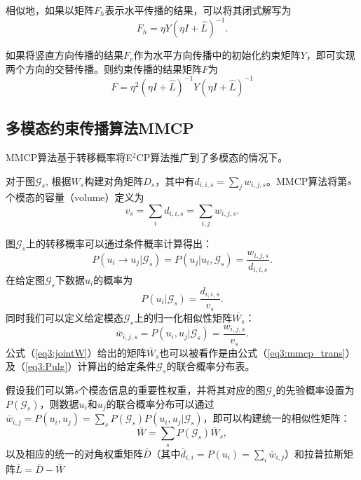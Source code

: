 相似地，如果以矩阵$F_h$表示水平传播的结果，可以将其闭式解写为
\begin{equation}
{F}_h = \eta{Y}(\eta{I}+\hat{{L}})^{-1}.
\end{equation}

如果将竖直方向传播的结果$F_v$作为水平方向传播中的初始化约束矩阵$Y$，即可实现两个方向的交替传播。则约束传播的结果矩阵$F$为
\begin{equation}
{F} = \eta^2(\eta{I}+\hat{{L}})^{-1}{Y}(\eta{I}+\hat{{L}})^{-1}
\label{eq3:e2cp}
\end{equation}

\subsection{多模态约束传播算法MMCP}
MMCP算法基于转移概率将E$^2$CP算法推广到了多模态的情况下。

对于图$\mathcal{G}_s$, 根据${W}_s$构建对角矩阵${D}_s$，其中有$d_{i,i,s} = \sum_j w_{i,j,s}$。MMCP算法将第$s$个模态的容量（volume）定义为
\begin{equation}
v_s = \sum_i d_{i,i,s} = \sum_{i,j}w_{i,j,s}.
\end{equation}

图$\mathcal{G}_s$上的转移概率可以通过条件概率计算得出：
\begin{equation}
	P(u_i\rightarrow u_j|\mathcal{G}_s) = P(u_j|u_i,\mathcal{G}_s) = \frac{w_{i,j,s}}{d_{i,i,s}}.
	\label{eq3:mmcp_trans}
\end{equation}
在给定图$\mathcal{G}_s$下数据$u_i$的概率为
\begin{equation}
P(u_i|\mathcal{G}_s) = \frac{d_{i,i,s}}{v_s}.
\label{eq3:Pulg}
\end{equation}
同时我们可以定义给定模态$\mathcal{G}_s$上的归一化相似性矩阵$\bar{W_s}$：
\begin{equation}
    \bar{w}_{i,j,s} = P(u_i, u_j|\mathcal{G}_s) = \frac{{w}_{i,j,s}}{v_s}.
    \label{eq3:jointW}
\end{equation}
公式（\ref{eq3:jointW}）给出的矩阵$\bar{W}_s$也可以被看作是由公式（\ref{eq3:mmcp_trans}）及（\ref{eq3:Pulg}）计算出的给定条件$\mathcal{G}_s$的联合概率分布表。

假设我们可以第$s$个模态信息的重要性权重，并将其对应的图$\mathcal{G}_s$的先验概率设置为$ P(\mathcal{G}_s) $，则数据$u_i$和$u_j$的联合概率分布可以通过$ \bar{w}_{i,j}= P(u_i, u_j) = \sum_s P(\mathcal{G}_s) P(u_i, u_j|\mathcal{G}_s) $，即可以构建统一的相似性矩阵：
\begin{equation}
\bar{{W}} = \sum_s P(\mathcal{G}_s)\bar{{W}}_s, 
\label{eq3:unifiedW}
\end{equation}
以及相应的统一的对角权重矩阵$ \bar{{D}}$（其中$ \bar{d}_{i,i} = P(u_i) =\sum_i \bar{w}_{i,j}$）和拉普拉斯矩阵$ \bar{{L}} = \bar{{D}}-\bar{{W}}$

